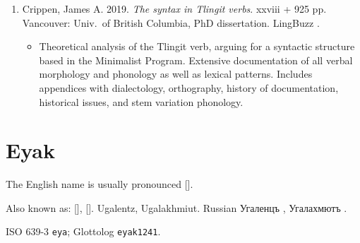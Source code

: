 \documentclass[12pt,letterpaper,oneside,article]{memoir}
\begin{document}
\begin{enumerate}
\begin{itemize}
	\end{itemize}
\item	Crippen, James A.
	2019.
	\textit{The syntax in Tlingit verbs}.
	xxviii + 925 pp.
	Vancouver: Univ.\ of British Columbia, PhD dissertation.
	LingBuzz .
	\begin{itemize}
	\item	Theoretical analysis of the Tlingit verb, arguing for a syntactic structure
		based in the Minimalist Program.
		Extensive documentation of all verbal morphology and phonology as well as
		lexical patterns.
		Includes appendices with dialectology, orthography, history of documentation,
		historical issues, and stem variation phonology.
	\end{itemize}
\end{enumerate}

\section{Eyak}\label{sec:eyak}

The English name  is usually pronounced []. 

Also known as:  [],  []. Ugalentz, Ugalakhmiut. Russian Угаленцъ , Угалахмютъ .

ISO 639-3 \texttt{eya}; Glottolog \texttt{eyak1241}.
\end{document}
